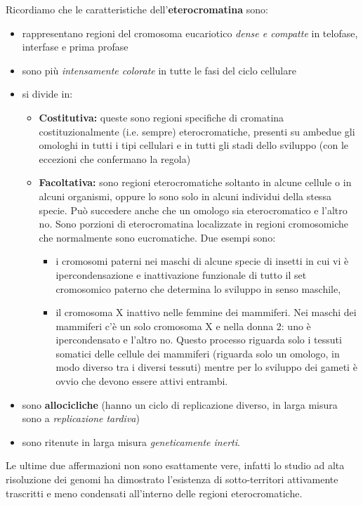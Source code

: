 \documentclass[11pt]{book}
\begin{document}
Ricordiamo che le caratteristiche dell'\textbf{eterocromatina} sono:
\begin{itemize}
\item rappresentano regioni del cromosoma eucariotico \emph{dense e compatte} in telofase, interfase e prima profase
\item sono più \emph{intensamente colorate} in tutte le fasi del ciclo cellulare
\item si divide in:
	\begin{itemize}
		\item \textbf{Costitutiva:} queste sono regioni specifiche di cromatina costituzionalmente (i.e. sempre) eterocromatiche, presenti su ambedue gli omologhi in tutti i tipi cellulari e in tutti gli stadi dello sviluppo (con le eccezioni che confermano la regola)
		\item \textbf{Facoltativa:} sono regioni eterocromatiche soltanto in alcune cellule o in alcuni organismi, oppure lo sono solo in alcuni individui della stessa specie. Può succedere anche che un omologo sia eterocromatico e l’altro no. Sono porzioni di eterocromatina localizzate in regioni cromosomiche che normalmente sono eucromatiche. Due esempi sono:
				\begin{itemize}
					\item i cromosomi paterni nei maschi di alcune specie di insetti in cui vi è ipercondensazione e inattivazione funzionale di tutto il set cromosomico paterno che determina lo sviluppo in senso maschile,
					\item il cromosoma X inattivo nelle femmine dei mammiferi. Nei maschi dei mammiferi c’è un solo cromosoma X e nella donna 2: uno è ipercondensato e l’altro no. Questo processo riguarda solo i tessuti somatici delle cellule dei mammiferi (riguarda solo un omologo, in modo diverso tra i diversi tessuti) mentre per lo sviluppo dei gameti è ovvio che devono essere attivi entrambi.
                  \end{itemize}
	\end{itemize}
\item sono \textbf{allocicliche} (hanno un ciclo di replicazione diverso, in larga misura sono a \emph{replicazione tardiva})
\item sono ritenute in larga misura \emph{geneticamente inerti}.
\end{itemize}

Le ultime due affermazioni non sono esattamente vere, infatti lo studio ad alta risoluzione dei genomi ha dimostrato l'esistenza di sotto-territori attivamente trascritti e meno condensati all'interno delle regioni eterocromatiche.
\end{document}
